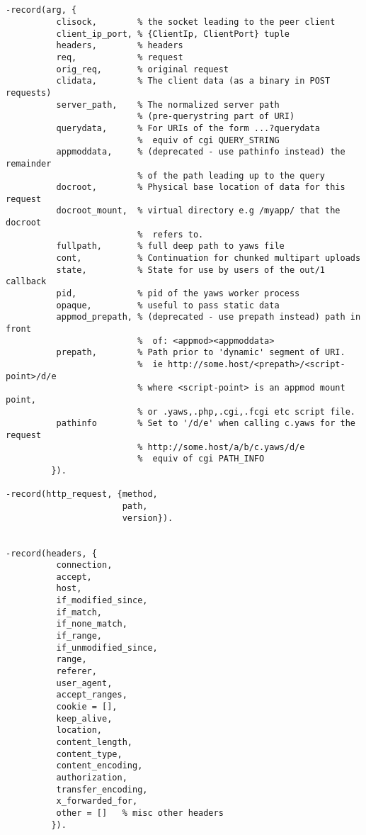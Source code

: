 \documentclass[11pt,oneside,english]{book}
\begin{document}
\begin{verbatim}


-record(arg, {
          clisock,        % the socket leading to the peer client
          client_ip_port, % {ClientIp, ClientPort} tuple
          headers,        % headers
          req,            % request
          orig_req,       % original request
          clidata,        % The client data (as a binary in POST requests)
          server_path,    % The normalized server path
                          % (pre-querystring part of URI)
          querydata,      % For URIs of the form ...?querydata
                          %  equiv of cgi QUERY_STRING
          appmoddata,     % (deprecated - use pathinfo instead) the remainder
                          % of the path leading up to the query
          docroot,        % Physical base location of data for this request
          docroot_mount,  % virtual directory e.g /myapp/ that the docroot
                          %  refers to.
          fullpath,       % full deep path to yaws file
          cont,           % Continuation for chunked multipart uploads
          state,          % State for use by users of the out/1 callback
          pid,            % pid of the yaws worker process
          opaque,         % useful to pass static data
          appmod_prepath, % (deprecated - use prepath instead) path in front
                          %  of: <appmod><appmoddata>
          prepath,        % Path prior to 'dynamic' segment of URI.
                          %  ie http://some.host/<prepath>/<script-point>/d/e
                          % where <script-point> is an appmod mount point,
                          % or .yaws,.php,.cgi,.fcgi etc script file.
          pathinfo        % Set to '/d/e' when calling c.yaws for the request
                          % http://some.host/a/b/c.yaws/d/e
                          %  equiv of cgi PATH_INFO
         }).

-record(http_request, {method,
                       path,
                       version}).


-record(headers, {
          connection,
          accept,
          host,
          if_modified_since,
          if_match,
          if_none_match,
          if_range,
          if_unmodified_since,
          range,
          referer,
          user_agent,
          accept_ranges,
          cookie = [],
          keep_alive,
          location,
          content_length,
          content_type,
          content_encoding,
          authorization,
          transfer_encoding,
          x_forwarded_for,
          other = []   % misc other headers
         }).

\end{verbatim}
\end{document}
